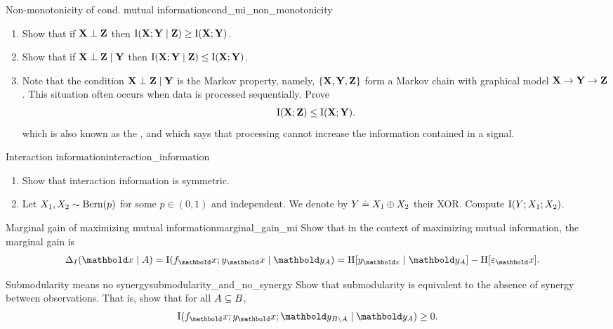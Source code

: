 \begin{nexercise}{Non-monotonicity of cond. mutual information}{cond_mi_non_monotonicity}
  \begin{enumerate}
    \item Show that if $\mathbf{X} \perp \mathbf{Z}$ then $\I{\rX}{\rY \mid \rZ} \geq \I{\rX}{\rY}$.

    \item Show that if $\mathbf{X} \perp \mathbf{Z} \mid \mathbf{Y}$ then $\I{\rX}{\rY \mid \rZ} \leq \I{\rX}{\rY}$.

    \item Note that the condition $\mathbf{X} \perp \mathbf{Z} \mid \mathbf{Y}$ is the Markov property, namely, $\{\mathbf{X}, \mathbf{Y}, \mathbf{Z}\}$ form a Markov chain with graphical model $\mathbf{X} \to \mathbf{Y} \to \mathbf{Z}$.
    This situation often occurs when data is processed sequentially.
    Prove \begin{align}
      \I{\rX}{\rZ} \leq \I{\rX}{\rY}. \label{eq:data_processing_inequality}
    \end{align} which is also known as the , and which says that processing cannot increase the information contained in a signal.
  \end{enumerate}
\end{nexercise}

\begin{nexercise}{Interaction information}{interaction_information}
  \begin{enumerate}
    \item Show that interaction information is symmetric.
    \item Let $X_1, X_2 \sim \Bern{p}$ for some $p \in (0,1)$ and independent.
    We denote by $Y \overset{.}{=} X_1 \oplus X_2$ their XOR.
    Compute $\I{Y ; X_1}{X_2}$.
  \end{enumerate}
\end{nexercise}

\begin{nexercise}{Marginal gain of maximizing mutual information}{marginal_gain_mi}
  Show that in the context of maximizing mutual information, the marginal gain is \begin{align*}
    \Delta_I(\vx \mid \sA) &= \Ism{f_\vx}{y_\vx}[\vy_\sA] = \H{y_{\vx} \mid \vy_\sA} - \H{\varepsilon_\vx}.
  \end{align*}
\end{nexercise}

\begin{nexercise}{Submodularity means no synergy}{submodularity_and_no_synergy}
  Show that submodularity is equivalent to the absence of synergy between observations.
  That is, show that for all $A \subseteq B$, \begin{align}
    \Ism{f_\vx}{y_\vx ; \vy_{\sB \setminus \sA}}[\vy_\sA] \geq 0.
  \end{align}
\end{nexercise}


